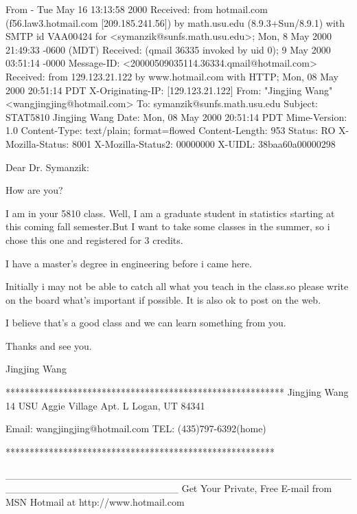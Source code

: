 From - Tue May 16 13:13:58 2000
Received: from hotmail.com (f56.law3.hotmail.com [209.185.241.56])
	by math.usu.edu (8.9.3+Sun/8.9.1) with SMTP id VAA00424
	for <symanzik@sunfs.math.usu.edu>; Mon, 8 May 2000 21:49:33 -0600 (MDT)
Received: (qmail 36335 invoked by uid 0); 9 May 2000 03:51:14 -0000
Message-ID: <20000509035114.36334.qmail@hotmail.com>
Received: from 129.123.21.122 by www.hotmail.com with HTTP;
	Mon, 08 May 2000 20:51:14 PDT
X-Originating-IP: [129.123.21.122]
From: "Jingjing Wang" <wangjingjing@hotmail.com>
To: symanzik@sunfs.math.usu.edu
Subject: STAT5810 Jingjing Wang
Date: Mon, 08 May 2000 20:51:14 PDT
Mime-Version: 1.0
Content-Type: text/plain; format=flowed
Content-Length: 953
Status: RO
X-Mozilla-Status: 8001
X-Mozilla-Status2: 00000000
X-UIDL: 38baa60a00000298

Dear Dr. Symanzik:

How are you?

I am in your 5810 class. Well, I am a graduate student in statistics
starting at this coming fall semester.But I want to take some classes
in the summer, so i chose this one and registered for 3 credits.

I have a master's degree in engineering before i came here.

Initially i may not be able to catch all what you teach in the class.so 
please write on the board what's important if possible.
It is also ok to post on the web.

I believe that's a good class and we can learn something from you.

Thanks and see you.

Jingjing Wang



**********************************************************
Jingjing Wang
14 USU Aggie Village Apt. L
Logan, UT 84341

Email: wangjingjing@hotmail.com
TEL:   (435)797-6392(home)

********************************************************

________________________________________________________________________
Get Your Private, Free E-mail from MSN Hotmail at http://www.hotmail.com

